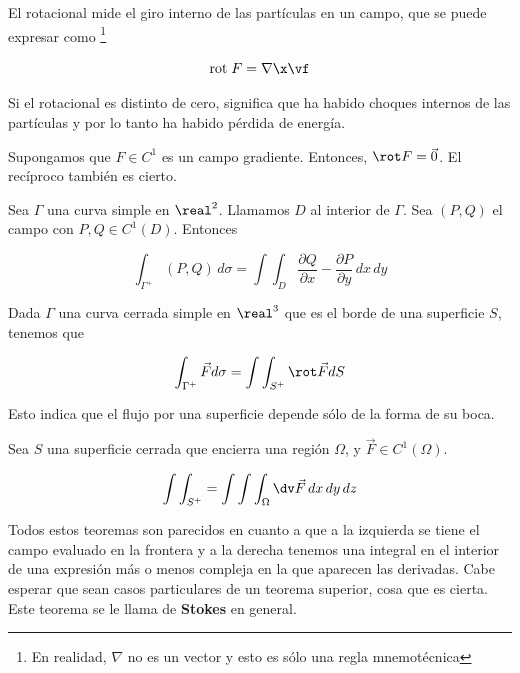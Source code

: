 \begin{defn}[Rotacional]
El rotacional mide el giro interno de las partículas en un campo, que se puede expresar como \footnote{En realidad, $\nabla$ no es un vector y esto es sólo una regla mnemotécnica}

\[ \textrm{rot}\;F = \nabla \x \vf \]

Si el rotacional es distinto de cero, significa que ha habido choques internos de las partículas y por lo tanto ha habido pérdida de energía.
\end{defn}

\begin{theorem}
Supongamos que $F\in C^1$ es un campo gradiente. Entonces, $\rot F = \vec{0}$. El recíproco también es cierto.
\end{theorem}


\begin{theorem}
Sea $\Gamma$ una curva simple en $\real^2$. Llamamos $D$ al interior de $\Gamma$. Sea $(P,Q)$ el campo con $P,Q\in C^1(D)$. Entonces

\[ \int_{\Gamma^+} (P,Q)\,d\sigma = \int\int_D \frac{\partial Q}{\partial x}-\frac{\partial P}{\partial y}\,dx\,dy\]
\end{theorem}

\begin{theorem}
Dada $\Gamma$ una curva cerrada simple en $\real^3$ que es el borde de una superficie $S$, tenemos que 

\[ \int_{\Gamma^+}\vec{F}d\sigma =\int\int_{S^+}\rot \vec{F}dS \]

Esto indica que el flujo por una superficie depende sólo de la forma de su boca.
\end{theorem}

\begin{theorem}
Sea $S$ una superficie cerrada que encierra una región $\Omega$, y $\vec{F}\in C^1(\Omega)$.

\[ \int\int_{S^+} = \int\int\int_\Omega \dv \vec{F}\, dx\, dy\, dz \]
\end{theorem}


Todos estos teoremas son parecidos en cuanto a que a la izquierda se tiene el campo evaluado en la frontera y a la derecha tenemos una integral en el interior de una expresión más o menos compleja en la que aparecen las derivadas. Cabe esperar que sean casos particulares de un teorema superior, cosa que es cierta. Este teorema se le llama de \textbf{Stokes} en general. 


